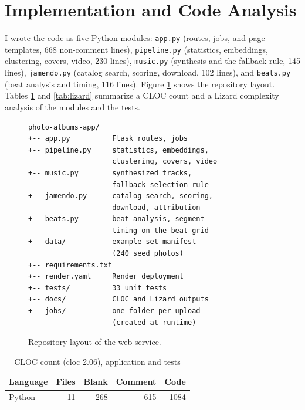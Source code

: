 \documentclass[conference]{IEEEtran}
\begin{document}
\section{Implementation and Code Analysis}
I wrote the code as five Python modules: \texttt{app.py} (routes,
jobs, and page templates, 668 non-comment lines),
\texttt{pipeline.py} (statistics, embeddings, clustering, covers,
video, 230 lines), \texttt{music.py} (synthesis and the fallback
rule, 145 lines), \texttt{jamendo.py} (catalog search, scoring,
download, 102 lines), and \texttt{beats.py} (beat analysis and
timing, 116 lines). Figure \ref{fig:tree} shows the repository
layout. Tables \ref{tab:cloc} and \ref{tab:lizard} summarize a
CLOC count and a Lizard complexity analysis of the modules and the
tests.

\begin{figure}[htbp]
\footnotesize
\begin{verbatim}
photo-albums-app/
+-- app.py          Flask routes, jobs
+-- pipeline.py     statistics, embeddings,
                    clustering, covers, video
+-- music.py        synthesized tracks,
                    fallback selection rule
+-- jamendo.py      catalog search, scoring,
                    download, attribution
+-- beats.py        beat analysis, segment
                    timing on the beat grid
+-- data/           example set manifest
                    (240 seed photos)
+-- requirements.txt
+-- render.yaml     Render deployment
+-- tests/          33 unit tests
+-- docs/           CLOC and Lizard outputs
+-- jobs/           one folder per upload
                    (created at runtime)
\end{verbatim}
\caption{Repository layout of the web service.}
\label{fig:tree}
\end{figure}

\begin{table}[htbp]
\caption{CLOC count (cloc 2.06), application and tests}
\begin{center}
\begin{tabular}{lrrrr}
\toprule
Language & Files & Blank & Comment & Code \\
\midrule
Python & 11 & 268 & 615 & 1084 \\
\bottomrule
\end{tabular}
\label{tab:cloc}
\end{center}
\end{table}
\end{document}
